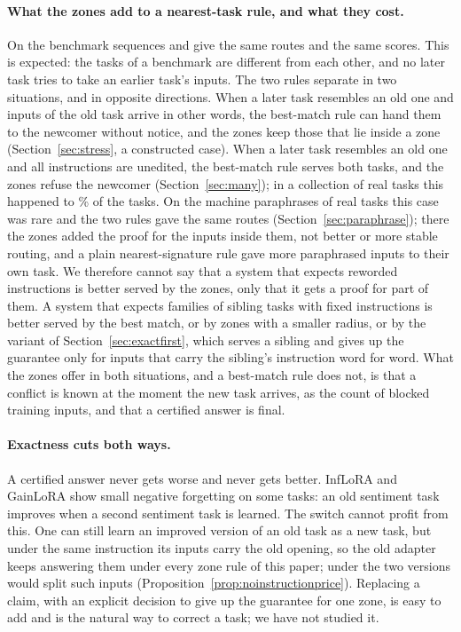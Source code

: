 \paragraph{What the zones add to a nearest-task rule, and what they cost.} On the benchmark
sequences \nearest{} and \cert{} give the same routes and the same scores. This is expected: the
tasks of a benchmark are different from each other, and no later task tries to take an earlier
task's inputs. The two rules separate in two situations, and in opposite directions. When a later
task resembles an old one and inputs of the old task arrive in other words, the best-match rule
can hand them to the newcomer without notice, and the zones keep those that lie inside a zone (Section~\ref{sec:stress}, a constructed case). When
a later task resembles an old one and all instructions are unedited, the best-match rule serves
both tasks, and the zones refuse the newcomer (Section~\ref{sec:many}); in a collection of
\ManyTasks{} real tasks this happened to \ManyCollidingPct{}\% of the tasks. On the machine paraphrases of \WidenTasksEval{} real tasks this case was rare and the two rules gave the same routes (Section~\ref{sec:paraphrase}); there the zones added the proof for the inputs inside them, not better or more stable routing, and a plain nearest-signature rule gave more paraphrased inputs to their own task. We therefore cannot say that a system that expects reworded instructions is better served by the zones, only that it gets a proof for part of them. A system that expects
families of sibling tasks with fixed instructions is better served by the best match, or by zones
with a smaller radius, or by the variant of Section~\ref{sec:exactfirst}, which serves a sibling
and gives up the guarantee only for inputs that carry the sibling's instruction word for word. What
the zones offer in both situations, and a best-match rule does not, is that a conflict is known at
the moment the new task arrives, as the count of blocked training inputs, and that a certified
answer is final.

\paragraph{Exactness cuts both ways.} A certified answer never gets worse and never gets better.
InfLoRA and GainLoRA show small negative forgetting on some tasks: an old sentiment task improves
when a second sentiment task is learned. The switch cannot profit from this. One can still learn an
improved version of an old task as a new task, but under the same instruction its inputs carry the
old opening, so the old adapter keeps answering them under every zone rule of this paper; under
\recog{} the two versions would split such inputs (Proposition~\ref{prop:noinstructionprice}).
Replacing a
claim, with an explicit decision to give up the guarantee for one zone, is easy to add and is the
natural way to correct a task; we have not studied it.

